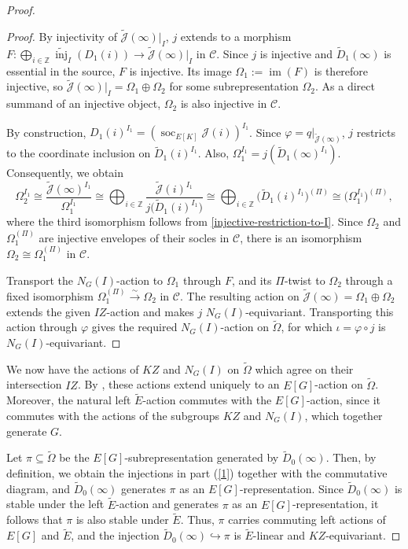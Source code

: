 \documentclass[a4paper,10pt,twoside]{amsart}
\theoremstyle{definition}
\numberwithin{equation}{section}
\begin{document}
\begin{proof}
\begin{proof}
By injectivity of \(\widetilde{\mathcal J}(\infty)|_I\),
\(j\) extends to a morphism
\(F:\bigoplus_{i\in\mathbb Z}
\widetilde{\operatorname{inj}}_I(D_1(i))
\to\widetilde{\mathcal J}(\infty)|_I\)
in \(\mathscr C\).
Since \(j\) is injective and \(\widetilde D_1(\infty)\) is
essential in the source, \(F\) is injective.
Its image \(\Omega_1:=\operatorname{im}(F)\) is therefore injective, so $\widetilde{\mathcal J}(\infty)|_I
=\Omega_1\oplus\Omega_2$ for some subrepresentation \(\Omega_2\).
As a direct summand of an injective object,
\(\Omega_2\) is also injective in \(\mathscr C\).

By construction,
\(D_1(i)^{I_1}
=(\operatorname{soc}_{E[K]}\mathcal J(i))^{I_1}\).
Since \(\varphi=q|_{\widetilde{\mathcal J}(\infty)}\),
\(j\) restricts to the coordinate inclusion on
\(\widetilde D_1(i)^{I_1}\).
Also,
\(\Omega_1^{I_1}=j(\widetilde D_1(\infty)^{I_1})\).
Consequently, we obtain
\[
\Omega_2^{I_1}
\cong
\frac{\widetilde{\mathcal J}(\infty)^{I_1}}{\Omega_1^{I_1}}
\cong
\bigoplus_{i\in\mathbb Z}
\frac{\widetilde{\mathcal J}(i)^{I_1}}
     {j\bigl(\widetilde D_1(i)^{I_1}\bigr)} \cong
\bigoplus_{i\in\mathbb Z}
\bigl(\widetilde D_1(i)^{I_1}\bigr)^{(\Pi)}
\cong
\bigl(\Omega_1^{I_1}\bigr)^{(\Pi)},
\]
where the third isomorphism follows from
\eqref{injective-restriction-to-I}.
Since \(\Omega_2\) and \(\Omega_1^{(\Pi)}\) are injective
envelopes of their socles in \(\mathscr C\), there is an
isomorphism \(\Omega_2\cong\Omega_1^{(\Pi)}\) in \(\mathscr C\).

Transport the \(N_G(I)\)-action to \(\Omega_1\) through \(F\),
and its \(\Pi\)-twist to \(\Omega_2\) through a fixed isomorphism \(\Omega_1^{(\Pi)}\xrightarrow{\sim}\Omega_2\)
in \(\mathscr C\).
The resulting action on
\(\widetilde{\mathcal J}(\infty)=\Omega_1\oplus\Omega_2\)
extends the given \(IZ\)-action and makes \(j\)
\(N_G(I)\)-equivariant.
Transporting this action through \(\varphi\) gives the required \(N_G(I)\)-action on \(\widetilde\Omega\), for which
\(\iota=\varphi\circ j\) is \(N_G(I)\)-equivariant.
\end{proof}


We now have the actions of $KZ$ and $N_G(I)$ on $\widetilde{\Omega}$ which agree on their intersection $IZ$. By \cite[Corollary~5.5.5]{Pas04}, these actions extend uniquely to an $E[G]$-action on $\widetilde{\Omega}$. Moreover, the natural left $\widetilde{E}$-action commutes with the $E[G]$-action, since it commutes with the actions of the subgroups $KZ$ and $N_G(I)$, which together generate $G$.

Let $\pi \subseteq \widetilde{\Omega}$ be the $E[G]$-subrepresentation generated by $\widetilde{D}_0(\infty)$. Then, by definition, we obtain the injections in part (\ref{1}) together with the commutative diagram, and $\widetilde{D}_0(\infty)$ generates $\pi$ as an $E[G]$-representation. Since $\widetilde{D}_0(\infty)$ is stable under the left $\widetilde{E}$-action and generates $\pi$ as an $E[G]$-representation, it follows that $\pi$ is also stable under $\widetilde{E}$. Thus, $\pi$ carries commuting left actions of $E[G]$ and $\widetilde{E}$, and the injection $\widetilde{D}_0(\infty) \hookrightarrow \pi$
is $\widetilde{E}$-linear and $KZ$-equivariant.


\end{proof}
\end{document}
